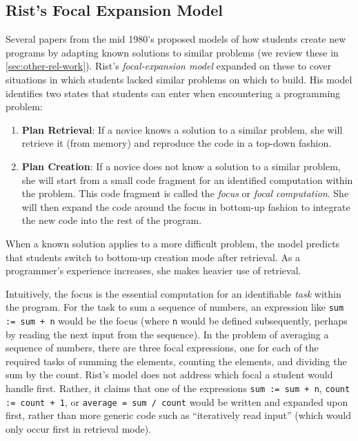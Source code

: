 \documentclass{sig-alternate-05-2015}
\begin{document}
\subsection{Rist's Focal Expansion Model}
\label{sec:rist}

Several papers from the mid 1980's proposed models of how students create new programs by adapting known solutions to similar problems (we review these in \cref{sec:other-rel-work}). Rist's \emph{focal-expansion model} \cite{Rist_1989, Rist_1991} expanded on these to cover situations in which students lacked similar problems on which to build. His model identifies two states that students can enter when encountering a programming problem:

\begin{enumerate}
	\item \textbf{Plan Retrieval}: If a novice knows a solution to a similar problem, she will retrieve it (from memory) and reproduce the code in a top-down fashion.
    \item \textbf{Plan Creation}: If a novice does not know a solution to a similar problem, she will start from a small code fragment for an identified computation within the problem. This code fragment is called the \textit{focus} or \textit{focal computation}. She will then expand the code around the focus in bottom-up fashion to integrate the new code into the rest of the program.
\end{enumerate}

\noindent
When a known solution applies to a more difficult problem, the model predicts that students switch to bottom-up creation mode after retrieval. As a programmer's experience increases, she makes heavier use of retrieval. 

Intuitively, the focus is the essential computation for an identifiable \emph{task} within the program. For the task to sum a sequence of numbers, an expression like \lstinline{sum := sum + n} would be the focus (where \lstinline{n} would be defined subsequently, perhaps by reading the next input from the sequence).  In the problem of averaging a sequence of numbers, there are three focal expressions, one for each of the required tasks of summing the elements, counting the elements, and dividing the sum by the count. Rist's model does not address which focal a student would handle first.  Rather, it claims that one of the expressions \lstinline{sum := sum + n}, \lstinline{count := count + 1}, or \lstinline{average = sum / count} would be written and expanded upon first, rather than more generic code such as ``iteratively read input'' (which would only occur first in retrieval mode).
\end{document}
